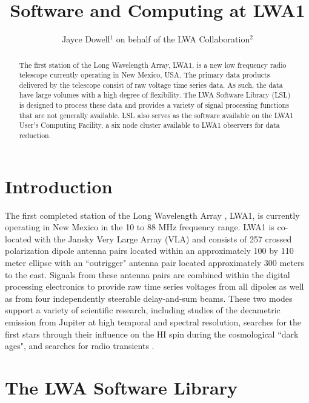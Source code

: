 \documentclass[11pt,twoside]{article}
\begin{document}
\title{Software and Computing at LWA1}
\author{
Jayce Dowell$^1$ on behalf of the LWA Collaboration$^2$
}

\begin{abstract}
The first station of the Long Wavelength Array, LWA1, is a new low frequency radio telescope currently operating in New Mexico, USA.  The primary data products delivered by the telescope consist of raw voltage time series data.  As such, the data have large volumes with a high degree of flexibility.  The LWA Software Library (LSL) is designed to process these data and provides a variety of signal processing functions that are not generally available.  LSL also serves as the software available on the LWA1 User's Computing Facility, a six node cluster available to LWA1 observers for data reduction.
\end{abstract}

\section{Introduction}
The first completed station of the Long Wavelength Array \citep[LWA;][]{LWA}, LWA1, is currently operating in New Mexico in the 10 to 88 MHz frequency range.  LWA1 is co-located with the Jansky Very Large Array (VLA) and consists of 257 crossed polarization dipole antenna pairs located within an approximately 100 by 110 meter ellipse with an ``outrigger" antenna pair located approximately 300 meters to the east.  Signals from these antenna pairs are combined within the digital processing electronics to provide raw time series voltages from all dipoles as well as from four independently steerable delay-and-sum beams.  These two modes support a variety of scientific research, including studies of the decametric emission from Jupiter at high temporal and spectral resolution, searches for the first stars through their influence on the HI spin during the cosmological ``dark ages", and searches for radio transients \citep[see][and references therein]{FL}.

\section{The LWA Software Library}
\end{document}
